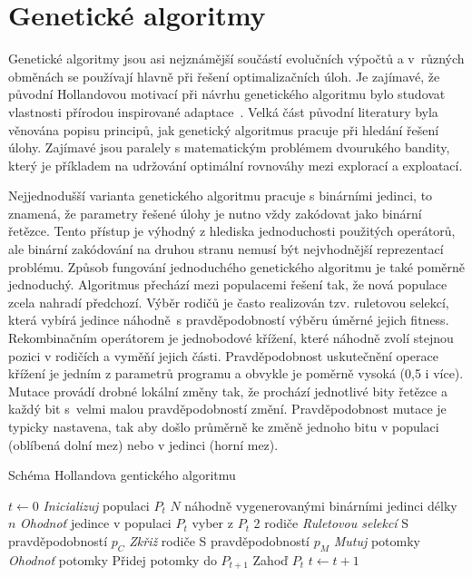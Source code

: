 \section{Genetické algoritmy}

Genetické algoritmy jsou asi nejznámější součástí evolučních výpočtů a v~různých obměnách se používají hlavně při řešení optimalizačních úloh. Je zajímavé, že původní Hollandovou motivací při návrhu genetického algoritmu bylo studovat vlastnosti přírodou inspirované adaptace~\cite{Holland:1992}. Velká část původní literatury byla věnována popisu principů, jak genetický algoritmus pracuje při hledání řešení úlohy. Zajímavé jsou paralely s matematickým problémem dvourukého bandity, který je příkladem na udržování optimální rovnováhy mezi explorací a exploatací. 

Nejjednodušší varianta genetického algoritmu pracuje s binárními jedinci, to znamená, že parametry řešené úlohy je nutno vždy zakódovat jako binární řetězce. Tento přístup je výhodný z hlediska jednoduchosti použitých operátorů, ale binární zakódování na druhou stranu nemusí být nejvhodnější reprezentací problému. Způsob fungování jednoduchého genetického algoritmu je také poměrně jednoduchý. Algoritmus přechází mezi populacemi řešení tak, že nová populace zcela nahradí předchozí. Výběr rodičů je často realizován tzv. ruletovou selekcí, která vybírá jedince náhodně~s pravděpodobností výběru úměrné jejich fitness. Rekombinačním operátorem je jednobodové křížení, které náhodně zvolí stejnou pozici v rodičích a vyměňí jejich části. Pravděpodobnost uskutečnění operace křížení je jedním z parametrů programu a obvykle je poměrně vysoká (0,5 i více). Mutace provádí drobné lokální změny tak, že prochází jednotlivé bity řetězce a každý bit s~velmi malou pravděpodobností změní. Pravděpodobnost mutace je typicky nastavena, tak aby došlo průměrně ke změně jednoho bitu v populaci (oblíbená dolní mez) nebo v jedinci (horní mez). 

\begin{algorithm}
\caption{Schéma Hollandova gentického algoritmu}
\label{obrga}
\begin{algorithmic}
\State $t \gets 0$
\State \emph{Inicializuj} populaci $P_t$ $N$ náhodně vygenerovanými binárními jedinci délky $n$
\State \emph{Ohodnoť} jedince v populaci $P_t$
\State 	vyber z $P_t$ 2 rodiče \emph{Ruletovou selekcí}
\State 	S pravděpodobností $p_C$ \emph{Zkřiž} rodiče
\State 	S pravděpodobností $p_M$ \emph{Mutuj} potomky
\State 	\emph{Ohodnoť} potomky
\State  Přidej potomky do $P_{t+1}$
\EndFor
\State 	Zahoď $P_t$
\State $t \gets t+1$
\EndWhile
\EndProcedure
\end{algorithmic}
\end{algorithm}

